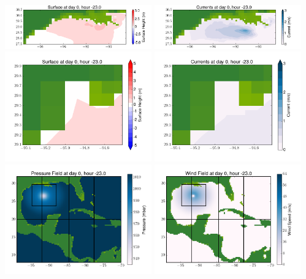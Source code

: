 \documentclass[11pt]{article}
\begin{document}
\includegraphics[width=0.475\textwidth]{frame0049fig4.png}
\vskip 10pt 
\includegraphics[width=0.475\textwidth]{frame0049fig5.png}
\includegraphics[width=0.475\textwidth]{frame0049fig6.png}
\vskip 10pt 
\includegraphics[width=0.475\textwidth]{frame0049fig7.png}
\includegraphics[width=0.475\textwidth]{frame0049fig8.png}
\vskip 10pt 
\includegraphics[width=0.475\textwidth]{frame0049fig9.png}
\end{document}
